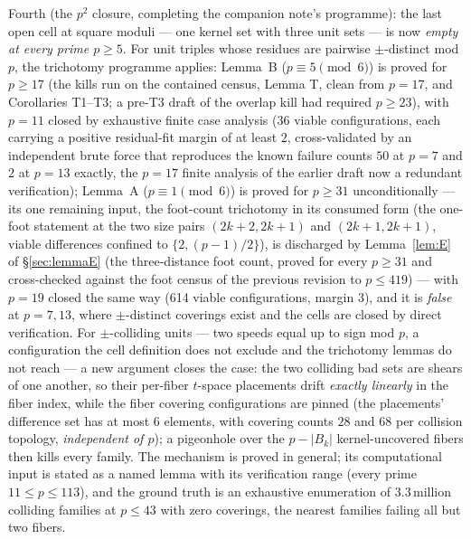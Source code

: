 \begin{remark}
\medskip
Fourth (the $p^2$ closure, completing the companion note's programme):
the last open cell at square moduli --- one kernel set with three unit
sets --- is now \emph{empty at every prime $p\ge5$}.  For unit triples
whose residues are pairwise $\pm$-distinct mod $p$, the trichotomy
programme applies: Lemma~B ($p\equiv5\pmod6$) is proved for $p\ge17$
(the kills run on the contained census, Lemma T, clean from $p=17$, and
Corollaries T1--T3; a pre-T3 draft of the overlap kill had required
$p\ge23$), with $p=11$ closed by exhaustive finite case analysis (36
viable configurations, each carrying a positive residual-fit margin of at
least $2$, cross-validated by an independent brute force that reproduces
the known failure counts $50$ at $p=7$ and $2$ at $p=13$ exactly, the
$p=17$ finite analysis of the earlier draft now a redundant
verification); Lemma~A ($p\equiv1\pmod6$) is proved for $p\ge31$
unconditionally --- its one remaining input, the foot-count trichotomy
in its consumed form (the one-foot statement at the two size pairs
$(2k{+}2,2k{+}1)$ and $(2k{+}1,2k{+}1)$, viable differences confined to
$\{2,(p-1)/2\}$), is discharged by Lemma~\ref{lem:E} of
\S\ref{sec:lemmaE} (the three-distance foot count, proved for every
$p\ge31$ and cross-checked against the foot census of the previous
revision to $p\le419$) --- with $p=19$ closed the same way (614
viable configurations, margin $3$), and it is \emph{false} at $p=7,13$,
where $\pm$-distinct coverings exist and the cells are closed by direct
verification. For $\pm$-colliding units ---
two speeds equal up to sign mod $p$, a configuration the cell definition
does not exclude and the trichotomy lemmas do not reach --- a new argument
closes the case: the two colliding bad sets are shears of one another, so
their per-fiber $t$-space placements drift \emph{exactly linearly} in the
fiber index, while the fiber covering configurations are pinned (the
placements' difference set has at most $6$ elements, with covering counts
$28$ and $68$ per collision topology, \emph{independent of $p$}); a
pigeonhole over the $p-|B_k|$ kernel-uncovered fibers then kills every
family.  The mechanism is proved in general; its computational input is
stated as a named lemma with its verification range (every prime
$11\le p\le 113$), and the ground truth is an exhaustive enumeration of
$3.3$\,million colliding families at $p\le43$ with zero coverings, the
nearest families failing all but two fibers.


\end{remark}
